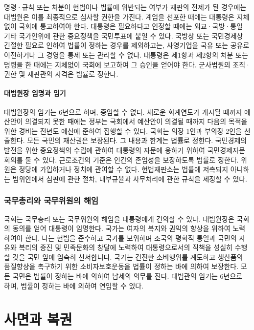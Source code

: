 \documentclass[master, korean]{pnuthesis}
\begin{document}
명령·규칙 또는 처분이 헌법이나 법률에 위반되는 여부가 재판의 전제가 된 경우에는 대법원은 이를 최종적으로 심사할 권한을 가진다. 계엄을 선포한 때에는 대통령은 지체없이 국회에 통고하여야 한다. 대통령은 필요하다고 인정할 때에는 외교·국방·통일 기타 국가안위에 관한 중요정책을 국민투표에 붙일 수 있다. 국방상 또는 국민경제상 긴절한 필요로 인하여 법률이 정하는 경우를 제외하고는, 사영기업을 국유 또는 공유로 이전하거나 그 경영을 통제 또는 관리할 수 없다. 대통령은 제1항과 제2항의 처분 또는 명령을 한 때에는 지체없이 국회에 보고하여 그 승인을 얻어야 한다. 군사법원의 조직·권한 및 재판관의 자격은 법률로 정한다.

\subsubsection{대법원장 임명과 임기}

대법원장의 임기는 6년으로 하며, 중임할 수 없다. 새로운 회계연도가 개시될 때까지 예산안이 의결되지 못한 때에는 정부는 국회에서 예산안이 의결될 때까지 다음의 목적을 위한 경비는 전년도 예산에 준하여 집행할 수 있다. 국회는 의장 1인과 부의장 2인을 선출한다. 모든 국민의 재산권은 보장된다. 그 내용과 한계는 법률로 정한다. 국민경제의 발전을 위한 중요정책의 수립에 관하여 대통령의 자문에 응하기 위하여 국민경제자문회의를 둘 수 있다. 근로조건의 기준은 인간의 존엄성을 보장하도록 법률로 정한다. 위원은 정당에 가입하거나 정치에 관여할 수 없다. 헌법재판소는 법률에 저촉되지 아니하는 범위안에서 심판에 관한 절차, 내부규율과 사무처리에 관한 규칙을 제정할 수 있다.

\subsection{국무총리와 국무위원의 해임}

국회는 국무총리 또는 국무위원의 해임을 대통령에게 건의할 수 있다. 대법원장은 국회의 동의를 얻어 대통령이 임명한다. 국가는 여자의 복지와 권익의 향상을 위하여 노력하여야 한다. 나는 헌법을 준수하고 국가를 보위하며 조국의 평화적 통일과 국민의 자유와 복리의 증진 및 민족문화의 창달에 노력하여 대통령으로서의 직책을 성실히 수행할 것을 국민 앞에 엄숙히 선서합니다. 국가는 건전한 소비행위를 계도하고 생산품의 품질향상을 촉구하기 위한 소비자보호운동을 법률이 정하는 바에 의하여 보장한다. 모든 국민은 법률이 정하는 바에 의하여 납세의 의무를 진다. 대법관의 임기는 6년으로 하며, 법률이 정하는 바에 의하여 연임할 수 있다.

\chapter{사면과 복권}
\end{document}
